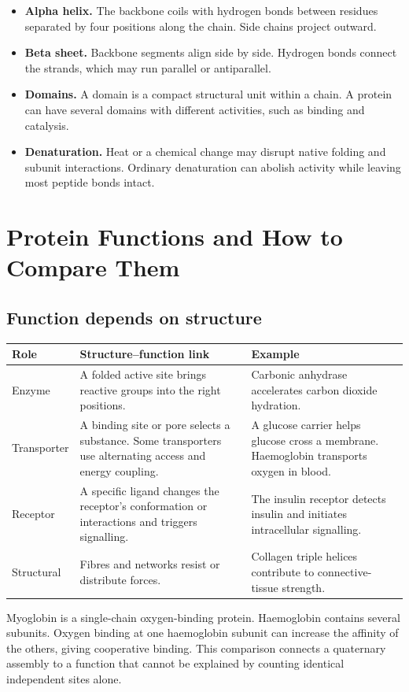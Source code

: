 \documentclass[12pt,a4paper]{article}
\begin{document}
\begin{itemize}[leftmargin=*, itemsep=3pt, topsep=4pt]
  \item \textbf{Alpha helix.} The backbone coils with hydrogen bonds between residues separated by four positions along the chain. Side chains project outward.
  \item \textbf{Beta sheet.} Backbone segments align side by side. Hydrogen bonds connect the strands, which may run parallel or antiparallel.
  \item \textbf{Domains.} A domain is a compact structural unit within a chain. A protein can have several domains with different activities, such as binding and catalysis.
  \item \textbf{Denaturation.} Heat or a chemical change may disrupt native folding and subunit interactions. Ordinary denaturation can abolish activity while leaving most peptide bonds intact.
\end{itemize}
\section{Protein Functions and How to Compare Them}
\subsection{Function depends on structure}
\par\vspace{5pt}
\begingroup
\setlength{\extrarowheight}{1pt}
\noindent\begin{tabularx}{\linewidth}{|B{3.1cm}|Y|Y|}
\hline
\textbf{Role} & \textbf{Structure--function link} & \textbf{Example} \\ \hline
Enzyme & A folded active site brings reactive groups into the right positions. & Carbonic anhydrase accelerates carbon dioxide hydration. \\ \hline
Transporter & A binding site or pore selects a substance. Some transporters use alternating access and energy coupling. & A glucose carrier helps glucose cross a membrane. Haemoglobin transports oxygen in blood. \\ \hline
Receptor & A specific ligand changes the receptor's conformation or interactions and triggers signalling. & The insulin receptor detects insulin and initiates intracellular signalling. \\ \hline
Structural & Fibres and networks resist or distribute forces. & Collagen triple helices contribute to connective-tissue strength. \\ \hline
\end{tabularx}\par
\endgroup
\begin{tcolorbox}[examplebox, title={Separate binding from cooperative behaviour}]
Myoglobin is a single-chain oxygen-binding protein. Haemoglobin contains several subunits. Oxygen binding at one haemoglobin subunit can increase the affinity of the others, giving cooperative binding. This comparison connects a quaternary assembly to a function that cannot be explained by counting identical independent sites alone.
\end{tcolorbox}
\end{document}
